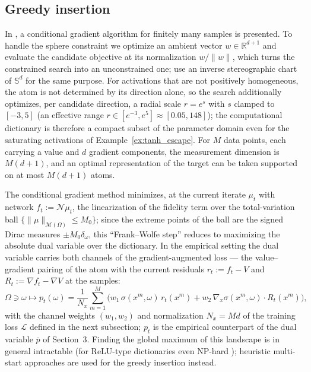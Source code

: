 \documentclass[11pt]{amsart}
\theoremstyle{definition}
\theoremstyle{remark}
\begin{document}
\subsection{Greedy insertion}
In \cite{bach2017breaking}, a conditional gradient algorithm for finitely many samples is presented. 
To handle the sphere constraint we optimize an ambient vector $w \in \mathbb{R}^{d+1}$ and evaluate the candidate objective at its normalization $w/\|w\|$, which turns the constrained search into an unconstrained one; \cite{pieper2022nonconvex} use an inverse stereographic chart of $\mathbb{S}^d$ for the same purpose.
For activations that are not positively homogeneous, the atom is not determined by its direction alone, so the search additionally optimizes, per candidate direction, a radial scale $r = e^{s}$ with $s$ clamped to $[-3, 5]$ (an effective range $r \in [e^{-3}, e^{5}] \approx [0.05, 148]$); the computational dictionary is therefore a compact subset of the parameter domain even for the saturating activations of Example~\ref{ex:tanh_escape}.
For $M$ data points, each carrying a value and $d$ gradient components, the measurement dimension is $M(d+1)$, and an optimal representation of the target can be taken supported on at most $M(d+1)$ atoms.

The conditional gradient method minimizes, at the current iterate $\mu_t$ with network $f_t := \mathcal{N}\mu_t$, the linearization of the fidelity term over the total-variation ball $\{\|\mu\|_{\mathcal{M}(\Omega)} \le M_0\}$; since the extreme points of the ball are the signed Dirac measures $\pm M_0 \delta_\omega$, this ``Frank--Wolfe step'' reduces to maximizing the absolute dual variable over the dictionary. In the empirical setting the dual variable carries both channels of the gradient-augmented loss --- the value--gradient pairing of the atom with the current residuals $r_t := f_t - V$ and $R_t := \nabla f_t - \nabla V$ at the samples:
\begin{equation}\label{emp_dual}
	\Omega \ni \omega \mapsto p_t(\omega) = \frac{1}{N_x} \sum_{m = 1}^M \Big( w_1\, \sigma(x^m, \omega)\, r_t(x^m) + w_2\, \nabla_x \sigma(x^m, \omega) \cdot R_t(x^m) \Big),
\end{equation}
with the channel weights $(w_1, w_2)$ and normalization $N_x = Md$ of the training loss $\mathcal{L}$ defined in the next subsection; $p_t$ is the empirical counterpart of the dual variable $\bar{p}$ of Section~3.
Finding the global maximum of this landscape is in general intractable (for ReLU-type dictionaries even NP-hard \cite{bach2017breaking}); heuristic multi-start approaches are used for the greedy insertion instead.
\end{document}
